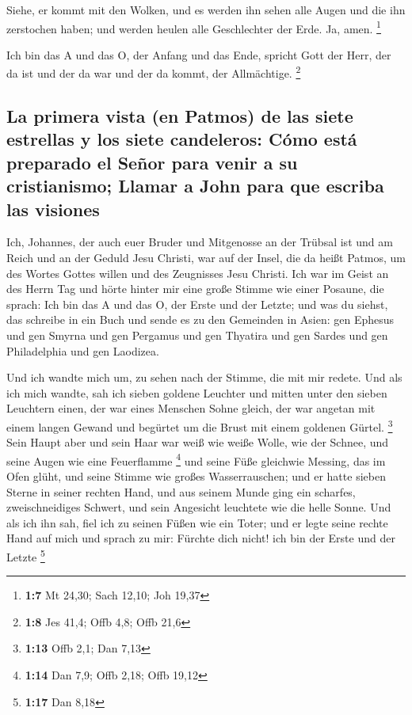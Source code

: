  Siehe, er kommt mit den Wolken, und es werden ihn sehen
alle Augen und die ihn zerstochen haben; und werden heulen alle
Geschlechter der Erde. Ja, amen. \footnote{\textbf{1:7} Mt 24,30; Sach
  12,10; Joh 19,37}

 Ich bin das A und das O, der Anfang und das Ende, spricht
Gott der Herr, der da ist und der da war und der da kommt, der
Allmächtige. \footnote{\textbf{1:8} Jes 41,4; Offb 4,8; Offb 21,6}

\hypertarget{la-primera-vista-en-patmos-de-las-siete-estrellas-y-los-siete-candeleros-cuxf3mo-estuxe1-preparado-el-seuxf1or-para-venir-a-su-cristianismo-llamar-a-john-para-que-escriba-las-visiones}{%
\subsection{La primera vista (en Patmos) de las siete estrellas y los
siete candeleros: Cómo está preparado el Señor para venir a su
cristianismo; Llamar a John para que escriba las
visiones}\label{la-primera-vista-en-patmos-de-las-siete-estrellas-y-los-siete-candeleros-cuxf3mo-estuxe1-preparado-el-seuxf1or-para-venir-a-su-cristianismo-llamar-a-john-para-que-escriba-las-visiones}}

 Ich, Johannes, der auch euer Bruder und Mitgenosse an der
Trübsal ist und am Reich und an der Geduld Jesu Christi, war auf der
Insel, die da heißt Patmos, um des Wortes Gottes willen und des
Zeugnisses Jesu Christi.  Ich war im Geist an des Herrn
Tag und hörte hinter mir eine große Stimme wie einer Posaune,
 die sprach: Ich bin das A und das O, der Erste und der
Letzte; und was du siehst, das schreibe in ein Buch und sende es zu den
Gemeinden in Asien: gen Ephesus und gen Smyrna und gen Pergamus und gen
Thyatira und gen Sardes und gen Philadelphia und gen Laodizea.

 Und ich wandte mich um, zu sehen nach der Stimme, die
mit mir redete. Und als ich mich wandte, sah ich sieben goldene Leuchter
 und mitten unter den sieben Leuchtern einen, der war
eines Menschen Sohne gleich, der war angetan mit einem langen Gewand und
begürtet um die Brust mit einem goldenen Gürtel. \footnote{\textbf{1:13}
  Offb 2,1; Dan 7,13}  Sein Haupt aber und sein Haar war
weiß wie weiße Wolle, wie der Schnee, und seine Augen wie eine
Feuerflamme \footnote{\textbf{1:14} Dan 7,9; Offb 2,18; Offb 19,12}
 und seine Füße gleichwie Messing, das im Ofen glüht, und
seine Stimme wie großes Wasserrauschen;  und er hatte
sieben Sterne in seiner rechten Hand, und aus seinem Munde ging ein
scharfes, zweischneidiges Schwert, und sein Angesicht leuchtete wie die
helle Sonne.  Und als ich ihn sah, fiel ich zu seinen
Füßen wie ein Toter; und er legte seine rechte Hand auf mich und sprach
zu mir: Fürchte dich nicht! ich bin der Erste und der Letzte \footnote{\textbf{1:17}
  Dan 8,18}

